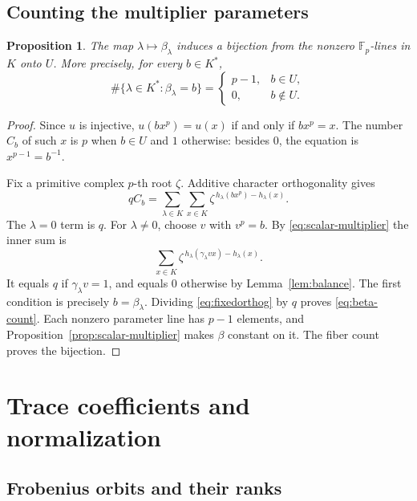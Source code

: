 \documentclass[11pt]{article}
\newtheorem{proposition}[theorem]{Proposition}
\theoremstyle{definition}
\theoremstyle{remark}
\newcommand{\Fp}{\mathbb F_p}
\numberwithin{equation}{section}
\begin{document}
\subsection{Counting the multiplier parameters}

\begin{proposition}\label{prop:projective}
The map \(\lambda\mapsto\beta_\lambda\) induces a bijection from
the nonzero \(\Fp\)-lines in \(K\) onto \(U\).
More precisely, for every \(b\in K^*\),
\begin{equation}\label{eq:beta-count}
 \#\{\lambda\in K^*:\beta_\lambda=b\}
 =\begin{cases}p-1,&b\in U,\\0,&b\notin U.\end{cases}
\end{equation}
\end{proposition}
\begin{proof}
Since \(u\) is injective, \(u(bx^p)=u(x)\) if and only if
\(bx^p=x\). The number \(C_b\) of such \(x\) is \(p\) when \(b\in U\)
and \(1\) otherwise: besides \(0\), the equation is
\(x^{p-1}=b^{-1}\).

Fix a primitive complex \(p\)-th root \(\zeta\).
Additive character orthogonality gives
\begin{equation}\label{eq:fixedorthog}
 qC_b=\sum_{\lambda\in K}\sum_{x\in K}
 \zeta^{\,h_\lambda(bx^p)-h_\lambda(x)}.
\end{equation}
The \(\lambda=0\) term is \(q\).
For \(\lambda\ne0\), choose \(v\) with \(v^p=b\).
By \eqref{eq:scalar-multiplier} the inner sum is
\[
 \sum_{x\in K}\zeta^{\,h_\lambda(\gamma_\lambda vx)-h_\lambda(x)}.
\]
It equals \(q\) if \(\gamma_\lambda v=1\), and equals \(0\) otherwise
by Lemma~\ref{lem:balance}. The first condition is precisely
\(b=\beta_\lambda\). Dividing \eqref{eq:fixedorthog} by \(q\) proves
\eqref{eq:beta-count}. Each nonzero parameter line has \(p-1\) elements,
and Proposition~\ref{prop:scalar-multiplier} makes \(\beta\) constant
on it. The fiber count proves the bijection.
\end{proof}

\section{Trace coefficients and normalization}
\label{sec:coefficients}

\subsection{Frobenius orbits and their ranks}
\end{document}
